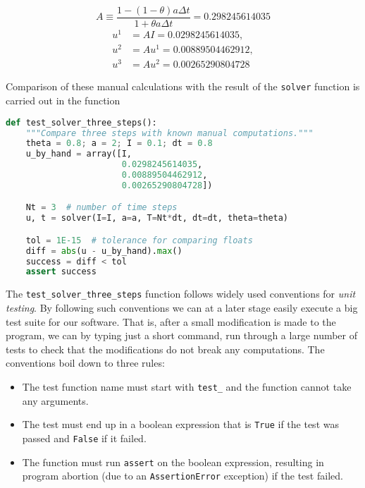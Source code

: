 \documentclass[graybox,sectrefs,envcountresetchap,open=right,final]{svmonodo}
\begin{document}
\[ A\equiv \frac{1 - (1-\theta) a\Delta t}{1 + \theta a \Delta t} = 0.298245614035\]
\begin{align*}
u^1 &= AI=0.0298245614035,\\ 
u^2 &= Au^1= 0.00889504462912,\\ 
u^3 &=Au^2= 0.00265290804728
\end{align*}


Comparison of these manual calculations with the result of the
\texttt{solver} function is carried out in the function

















\begin{lstlisting}[language=python,style=blue1_bluegreen]
def test_solver_three_steps():
    """Compare three steps with known manual computations."""
    theta = 0.8; a = 2; I = 0.1; dt = 0.8
    u_by_hand = array([I,
                       0.0298245614035,
                       0.00889504462912,
                       0.00265290804728])

    Nt = 3  # number of time steps
    u, t = solver(I=I, a=a, T=Nt*dt, dt=dt, theta=theta)

    tol = 1E-15  # tolerance for comparing floats
    diff = abs(u - u_by_hand).max()
    success = diff < tol
    assert success

\end{lstlisting}

The \Verb!test_solver_three_steps! function follows widely used conventions
for \emph{unit testing}. By following such conventions we can at a later
stage easily execute a big test suite for our software. That is, after
a small modification is made to the program, we can by typing just
a short command, run through a large number of tests to check that the
modifications do not break any computations.
The conventions boil down to three rules:

\begin{itemize}
 \item The test function name must start with \Verb!test_! and the function cannot take any arguments.

 \item The test must end up in a boolean expression that is \texttt{True} if the test was passed and \texttt{False} if it failed.

 \item The function must run \texttt{assert} on the boolean expression, resulting in program abortion (due to an \texttt{AssertionError} exception) if the test failed.
\end{itemize}
\end{document}
